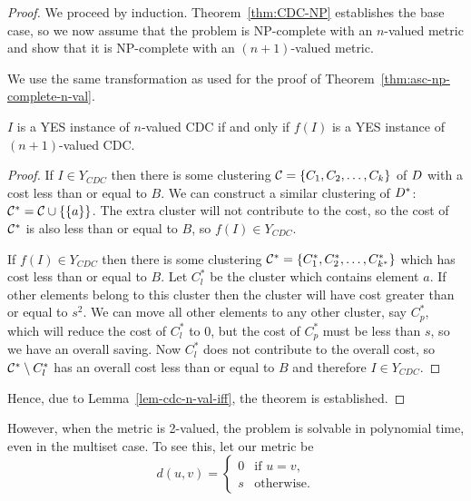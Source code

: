 \begin{proof}
  We proceed by induction.  Theorem~\ref{thm:CDC-NP} establishes the base
  case, so we now assume that the problem is NP-complete with an $n$-valued
  metric and show that it is NP-complete with an $(n+1)$-valued metric.

  We use the same transformation as used for the proof of
  Theorem~\ref{thm:asc-np-complete-n-val}.

  \begin{lem}
    \label{lem-cdc-n-val-iff}
    $I$ is a YES instance of $n$-valued CDC if and only if $f(I)$ is a YES
    instance of $(n+1)$-valued CDC.
  \end{lem}

  \begin{proof}
    If $I \in Y_{CDC}$ then there is some clustering $\mathcal{C} =
    \{C_1,C_2,\dotsc,C_k\}$ of $D$ with a cost less than or equal to $B$.
    We can construct a similar clustering of $D^*$: $\mathcal{C}^* = \mathcal{C} \cup
    \{\{a\}\}$.  The extra cluster will not contribute to the cost, so the
    cost of $\mathcal{C}^*$ is also less than or equal to $B$, so $f(I) \in
    Y_{CDC}$.

    If $f(I) \in Y_{CDC}$ then there is some clustering $\mathcal{C}^* =
    \{C^*_1,C^*_2,\dotsc,C^*_{k^*}\}$ which has cost less than or equal to
    $B$.  Let $C^*_l$ be the cluster which contains element $a$.  If other
    elements belong to this cluster then the cluster will have cost greater
    than or equal to $s^2$.  We can move all other elements to any other
    cluster, say $C^*_p$, which will reduce the cost of $C^*_l$ to 0, but the
    cost of $C^*_p$ must be less than $s$, so we have an overall saving.  Now
    $C^*_l$ does not contribute to the overall cost, so $\mathcal{C}^* \setminus
    C^*_l$ has an overall cost less than or equal to $B$ and therefore $I \in
    Y_{CDC}$.
  \end{proof}
  Hence, due to Lemma~\ref{lem-cdc-n-val-iff}, the theorem is established.
\end{proof}

However, when the metric is 2-valued, the problem is solvable in polynomial
time, even in the multiset case.  To see this, let our metric be
\begin{equation*}
  d(u,v) =
  \begin{cases}
    0 & \text{if $u=v$,}\\
    s & \text{otherwise.}
  \end{cases}
\end{equation*}

